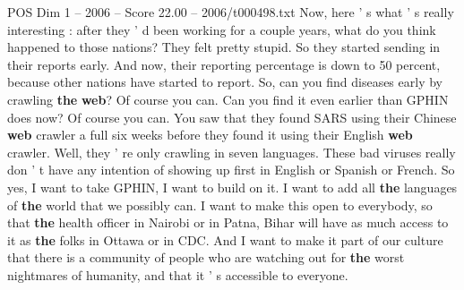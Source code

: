 \begin{textsample}{POS Dim 1 – 2006 – Score 22.00 – 2006/t000498.txt}
Now, here ' s what ' s really interesting : after they ' d been working for a couple years, what do you think happened to those nations?
They felt pretty stupid.
So they started sending in their reports early.
And now, their reporting percentage is down to 50 percent, because other nations have started to report.
So, can you find diseases early by crawling \textbf{the} \textbf{web}?
Of course you can.
Can you find it even earlier than GPHIN does now?
Of course you can.
You saw that they found SARS using their Chinese \textbf{web} crawler a full six weeks before they found it using their English \textbf{web} crawler.
Well, they ' re only crawling in seven languages.
These bad viruses really don ' t have any intention of showing up first in English or Spanish or French.
So yes, I want to take GPHIN, I want to build on it.
I want to add all \textbf{the} languages of \textbf{the} world that we possibly can.
I want to make this open to everybody, so that \textbf{the} health officer in Nairobi or in Patna, Bihar will have as much access to it as \textbf{the} folks in Ottawa or in CDC.
And I want to make it part of our culture that there is a community of people who are watching out for \textbf{the} worst nightmares of humanity, and that it ' s accessible to everyone.

\end{textsample}
